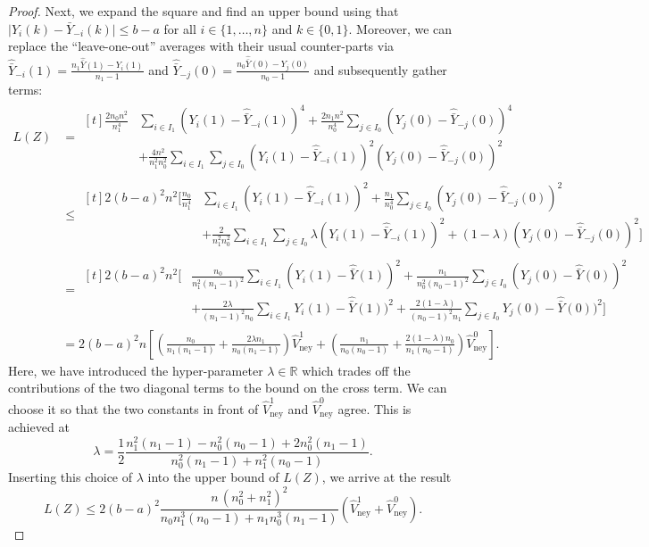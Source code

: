 \documentclass[10pt,a4paper]{amsart}
\newcommand{\R}{\mathbb{R}}
\newcommand{\vhn}{\hat{V}_{\mathrm{ney}}}
\newcommand{\ybh}{\hat{\bar{Y}}}
\newcommand{\yb}{\bar{Y}}
\begin{document}
\begin{proof}
     Next, we expand the square and find an upper bound using that $\lvert Y_i(k) - \yb_{-i}(k) \rvert \leq b-a$ for all $i \in \{1,\ldots,n\}$ and $k\in \{0,1\}$. Moreover, we can replace the ``leave-one-out'' averages with their usual counter-parts via $\ybh_{-i}(1)= \frac{n_1\ybh(1)-Y_i(1)}{n_1-1}$ and $\ybh_{-j}(0)= \frac{n_0\ybh(0)-Y_j(0)}{n_0-1}$ and subsequently gather terms:
     {\allowdisplaybreaks
    \begin{align*}
        L(Z) &= \begin{aligned}[t]
        \frac{2 n_0 n^2}{n_1^4} &\sum_{i \in I_1} (Y_i(1)-\ybh_{-i}(1))^4 + \frac{2 n_1 n^2}{n_0^4} \sum_{j \in I_0} (Y_j(0)-\ybh_{-j}(0))^4 \\
        &+ \frac{4n^2}{n_1^2 n_0^2} \sum_{i \in I_1} \sum_{j \in I_0} (Y_i(1)-\ybh_{-i}(1))^2 (Y_j(0)-\ybh_{-j}(0))^2
        \end{aligned}\\
        &\leq\begin{aligned}[t]
        2 (b-a)^2 n^2\Bigg[
        \frac{n_0}{n_1^4} &\sum_{i \in I_1} (Y_i(1)-\ybh_{-i}(1))^2 + \frac{n_1}{n_0^4} \sum_{j \in I_0} (Y_j(0)-\ybh_{-j}(0))^2 \\
        &+ \frac{2}{n_1^2 n_0^2} \sum_{i \in I_1} \sum_{j \in I_0} \lambda (Y_i(1)-\ybh_{-i}(1))^2 + (1-\lambda) (Y_j(0)-\ybh_{-j}(0))^2\Bigg]
        \end{aligned}\\
        &=\begin{aligned}[t]
        2 (b-a)^2 n^2\Bigg[
        &\frac{n_0}{n_1^2(n_1-1)^2} \sum_{i \in I_1} (Y_i(1)-\ybh(1))^2 + \frac{n_1}{n_0^2(n_0-1)^2} \sum_{j \in I_0} (Y_j(0)-\ybh(0))^2 \\
        & + \frac{2 \lambda}{(n_1-1)^2n_0} \sum_{i \in I_1} Y_i(1)-\ybh(1))^2 + \frac{2 (1-\lambda)}{(n_0-1)^2n_1} \sum_{j \in I_0} Y_j(0)-\ybh(0))^2\Bigg]
        \end{aligned}\\
        &=2(b-a)^2 n \left[\left(\frac{n_0}{n_1(n_1-1)} + \frac{2\lambda n_1}{n_0 (n_1-1)}\right) \vhn^1 + \left(\frac{n_1}{n_0(n_0-1)}+\frac{2(1-\lambda)n_0}{n_1(n_0-1)}\right) \vhn^0\right].
    \end{align*}
    }
    Here, we have introduced the hyper-parameter $\lambda \in \R$ which trades off the contributions of the two diagonal terms to the bound on the cross term. We can choose it so that the two constants in front of $\vhn^1$ and $\vhn^0$ agree. This is achieved at
    \begin{equation*}
        \lambda = \frac{1}{2} \frac{n_1^2(n_1-1) - n_0^2(n_0-1) + 2n_0^2(n_1-1)}{n_0^2(n_1-1)+n_1^2(n_0-1)}.
    \end{equation*}
    Inserting this choice of $\lambda$ into the upper bound of $L(Z)$, we arrive at the result
    \begin{equation*}
        L(Z) \leq 2 (b-a)^2 \frac{n\,(n_0^2+n_1^2)^2}{n_0n_1^3(n_0-1) + n_1 n_0^3(n_1-1)} (\vhn^1+\vhn^0).
    \end{equation*}
\end{proof}
\end{document}
